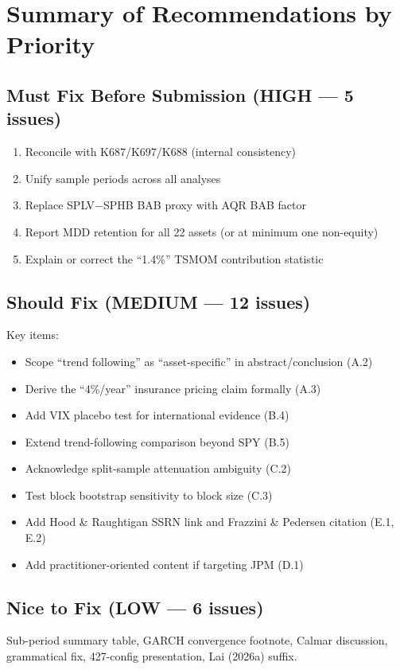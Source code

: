 \documentclass[12pt,a4paper]{article}
\begin{document}
\section{Summary of Recommendations by Priority}

\subsection*{Must Fix Before Submission (HIGH --- 5 issues)}
\begin{enumerate}
\item[\textbf{A.1}] Reconcile with K687/K697/K688 (internal consistency)
\item[\textbf{B.1}] Unify sample periods across all analyses
\item[\textbf{B.2}] Replace SPLV$-$SPHB BAB proxy with AQR BAB factor
\item[\textbf{B.3}] Report MDD retention for all 22 assets (or at minimum one non-equity)
\item[\textbf{C.1}] Explain or correct the ``1.4\%'' TSMOM contribution statistic
\end{enumerate}

\subsection*{Should Fix (MEDIUM --- 12 issues)}
Key items:
\begin{itemize}
\item Scope ``trend following'' as ``asset-specific'' in abstract/conclusion (A.2)
\item Derive the ``4\%/year'' insurance pricing claim formally (A.3)
\item Add VIX placebo test for international evidence (B.4)
\item Extend trend-following comparison beyond SPY (B.5)
\item Acknowledge split-sample attenuation ambiguity (C.2)
\item Test block bootstrap sensitivity to block size (C.3)
\item Add Hood \& Raughtigan SSRN link and Frazzini \& Pedersen citation (E.1, E.2)
\item Add practitioner-oriented content if targeting JPM (D.1)
\end{itemize}

\subsection*{Nice to Fix (LOW --- 6 issues)}
Sub-period summary table, GARCH convergence footnote, Calmar discussion, grammatical fix, 427-config presentation, Lai (2026a) suffix.
\end{document}
